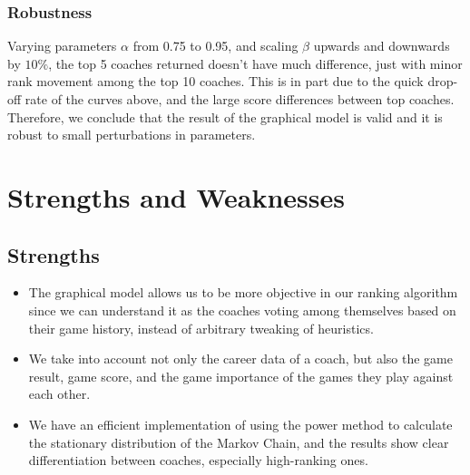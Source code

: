 \documentclass[titlepage,11pt]{article}
\begin{document}
\subsubsection*{Robustness}

\noindent Varying parameters $\alpha$ from 0.75 to 0.95, and scaling $\beta$ upwards and downwards by $10\%$, the top 5 coaches returned doesn't have much difference, just with minor rank movement among the top 10 coaches. This is in part due to the quick drop-off rate of the curves above, and the large score differences between top coaches. Therefore, we conclude that the result of the graphical model is valid and it is robust to small perturbations in parameters.

\section{Strengths and Weaknesses}

\subsection{Strengths}
\begin{itemize}
\item The graphical model allows us to be more objective in our ranking algorithm since we can understand it as the coaches voting among themselves based on their game history, instead of arbitrary tweaking of heuristics.

\item We take into account not only the career data of a coach, but also the game result, game score, and the game importance of the games they play against each other.

\item We have an efficient implementation of using the power method to calculate the stationary distribution of the Markov Chain, and the results show clear differentiation between coaches, especially high-ranking ones.
\end{itemize}
\end{document}
